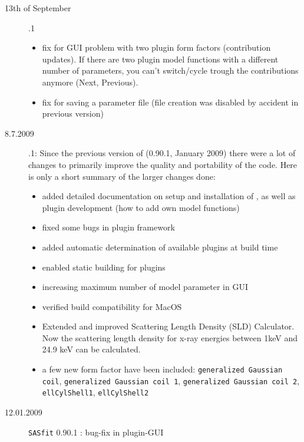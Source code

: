 \begin{description}
\begin{itemize}
        \end{itemize}
    \item[13th of September] .1
        \begin{itemize}
          \item fix for GUI problem with two plugin form factors (contribution updates).
                If there are two plugin model functions with a different number of parameters,
                you can't switch/cycle trough the contributions anymore (Next, Previous).
          \item fix for saving a parameter file (file creation was disabled by accident in previous version)
        \end{itemize}
        \item[8.7.2009] .1: Since the previous version of
                    \SASfit (0.90.1, January 2009) there were a lot of changes to
                    primarily improve the quality and portability of the code. Here is
                    only a short summary of the larger changes done:
        \begin{itemize}
            \item added detailed documentation on setup and installation of \SASfit,
                  as well as plugin development (how to add own model functions)
            \item fixed some bugs in plugin framework
            \item added automatic determination of available plugins at build time
            \item enabled static building for plugins
            \item increasing maximum number of model parameter in GUI
            \item verified build compatibility for MacOS
            \item Extended and improved Scattering Length Density (SLD) Calculator.
                  Now the scattering length density for x-ray energies between 1keV
                  and 24.9 keV can be calculated.
            \item a few new form factor have been included:
                        \texttt{generalized Gaussian coil},
                        \texttt{generalized Gaussian coil 1},
                        \texttt{generalized Gaussian coil 2},
                        \texttt{ellCylShell1},
                        \texttt{ellCylShell2}
        \end{itemize}
    \item[12.01.2009]{\tt SASfit} 0.90.1 : bug-fix in plugin-GUI

\end{description}

